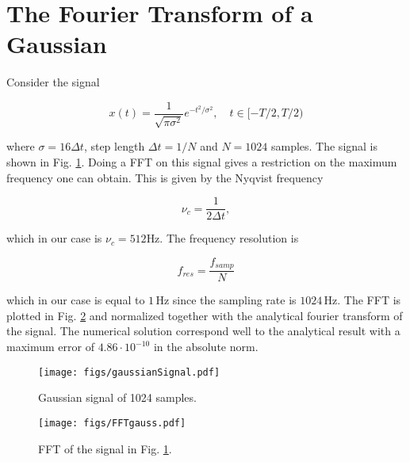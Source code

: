 \section{The Fourier Transform of a Gaussian}

Consider the signal

\begin{equation}
  \label{eq:gauss}
  x(t) = \frac{1}{\sqrt{\pi \sigma^2}} e^{-t^2/\sigma^2}, \quad t \in [-T/2,T/2)
\end{equation}

where $\sigma = 16 \Delta t$, step length $\Delta t = 1/N$ and $N = 1024$ samples. The signal is shown in Fig. \ref{fig:gaussSignal}. Doing a FFT on this signal gives a restriction on the maximum frequency one can obtain. This is given by the Nyqvist frequency

\begin{equation*}
  \nu_c = \frac{1}{2\Delta t},
\end{equation*}

which in our case is $\nu_c = 512$Hz. The frequency resolution is

\begin{equation*}
  f_{res} = \frac{f_{samp}}{N}
\end{equation*}

which in our case is equal to $1\,$Hz since the sampling rate is $1024\,$Hz.
 The FFT is plotted in Fig. \ref{fig:FFTgauss} and normalized together with the analytical fourier transform of the signal. The numerical solution correspond well to the analytical result with a maximum error of $4.86 \cdot 10^{-10}$ in the absolute norm.

\begin{figure}[H]
  \centering
  \texttt{[image: figs/gaussianSignal.pdf]}
  \caption{Gaussian signal of 1024 samples.}
  \label{fig:gaussSignal}
\end{figure}


\begin{figure}[H]
  \centering
  \texttt{[image: figs/FFTgauss.pdf]}
  \caption{FFT of the signal in Fig. \ref{fig:gaussSignal}.}
  \label{fig:FFTgauss}
\end{figure}
